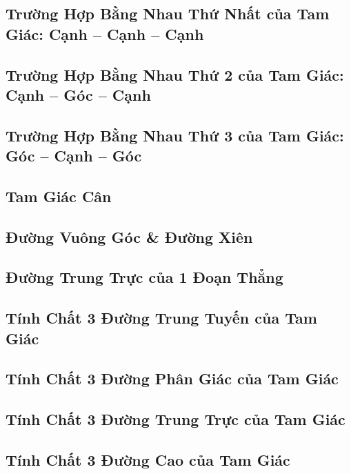 \documentclass{article}
\numberwithin{equation}{section}
\begin{document}
\subsection{Trường Hợp Bằng Nhau Thứ Nhất của Tam Giác: Cạnh -- Cạnh -- Cạnh}

\subsection{Trường Hợp Bằng Nhau Thứ 2 của Tam Giác: Cạnh -- Góc -- Cạnh}

\subsection{Trường Hợp Bằng Nhau Thứ 3 của Tam Giác: Góc -- Cạnh -- Góc}

\subsection{Tam Giác Cân}

\subsection{Đường Vuông Góc \& Đường Xiên}

\subsection{Đường Trung Trực của 1 Đoạn Thẳng}

\subsection{Tính Chất 3 Đường Trung Tuyến của Tam Giác}

\subsection{Tính Chất 3 Đường Phân Giác của Tam Giác}

\subsection{Tính Chất 3 Đường Trung Trực của Tam Giác}

\subsection{Tính Chất 3 Đường Cao của Tam Giác}


\printbibliography[heading=bibintoc]
	
\end{document}
